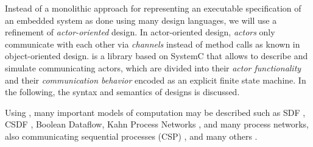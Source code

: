 %

 
Instead of a monolithic approach for representing an executable specification of an embedded system as done using many design languages, we will use a refinement of \emph{actor-oriented} design.
In actor-oriented design, \emph{actors} only communicate with each other via \emph{channels} instead of method calls as known
in object-oriented design.
\SysteMoC{} is a library based on SystemC that allows to describe and simulate communicating actors, which are divided into their \emph{actor functionality} and their \emph{communication behavior} encoded as an explicit finite state machine.
In the following, the syntax and semantics of \SysteMoC{} designs is discussed.

Using \SysteMoC, many important models of computation may be described such as 
SDF \cite{Lee87b:1987}, CSDF \cite{belp:1996, eblp:1994}, Boolean Dataflow, 
Kahn Process Networks \cite{Kahn:1974}, 
and many process networks, also communicating sequential processes (CSP)
\cite{csphoare:1985}, and many others \cite{tszet:1999, LeeDenotialDF:1997,
embsft:2002, Lee98, Eker, Tei97}.

